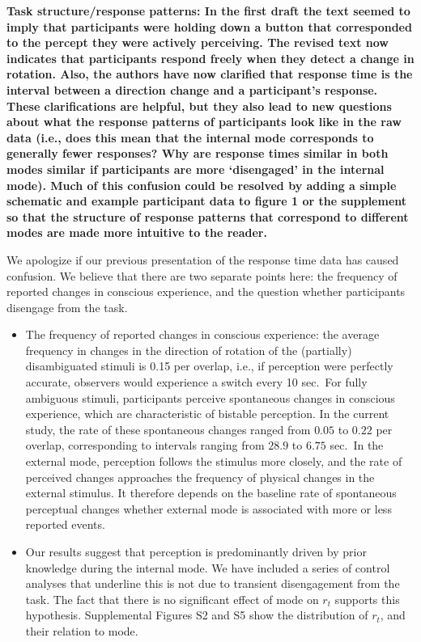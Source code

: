 \documentclass[
]{article}
\begin{document}
\textbf{Task structure/response patterns: In the first draft the text
seemed to imply that participants were holding down a button that
corresponded to the percept they were actively perceiving. The revised
text now indicates that participants respond freely when they detect a
change in rotation. Also, the authors have now clarified that response
time is the interval between a direction change and a participant's
response. These clarifications are helpful, but they also lead to new
questions about what the response patterns of participants look like in
the raw data (i.e., does this mean that the internal mode corresponds to
generally fewer responses? Why are response times similar in both modes
similar if participants are more `disengaged' in the internal mode).
Much of this confusion could be resolved by adding a simple schematic
and example participant data to figure 1 or the supplement so that the
structure of response patterns that correspond to different modes are
made more intuitive to the reader.}

We apologize if our previous presentation of the response time data has
caused confusion. We believe that there are two separate points here:
the frequency of reported changes in conscious experience, and the
question whether participants disengage from the task.

\begin{itemize}
\item
  The frequency of reported changes in conscious experience: the average
  frequency in changes in the direction of rotation of the (partially)
  disambiguated stimuli is 0.15 per overlap, i.e., if perception were
  perfectly accurate, observers would experience a switch every 10
  sec.~For fully ambiguous stimuli, participants perceive spontaneous
  changes in conscious experience, which are characteristic of bistable
  perception. In the current study, the rate of these spontaneous
  changes ranged from \(0.05\) to \(0.22\) per overlap, corresponding to
  intervals ranging from \(28.9\) to \(6.75\) sec.~In the external mode,
  perception follows the stimulus more closely, and the rate of
  perceived changes approaches the frequency of physical changes in the
  external stimulus. It therefore depends on the baseline rate of
  spontaneous perceptual changes whether external mode is associated
  with more or less reported events.
\item
  Our results suggest that perception is predominantly driven by prior
  knowledge during the internal mode. We have included a series of
  control analyses that underline this is not due to transient
  disengagement from the task. The fact that there is no significant
  effect of mode on \(r_t\) supports this hypothesis. Supplemental
  Figures S2 and S5 show the distribution of \(r_t\), and their relation
  to mode.
\end{itemize}
\end{document}
